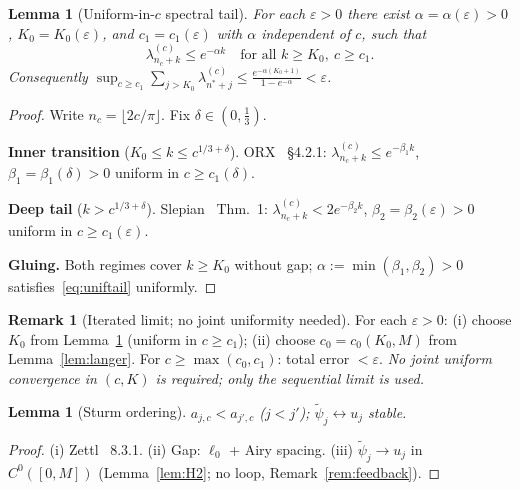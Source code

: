 \documentclass[12pt,a4paper]{amsart}
\newtheorem{lemma}[theorem]{Lemma}
\theoremstyle{definition}
\newtheorem{remark}[theorem]{Remark}
\begin{document}
\begin{lemma}[Uniform-in-$c$ spectral tail]
\label{lem:slepianunif}
For each $\varepsilon>0$ there exist
$\alpha=\alpha(\varepsilon)>0$, $K_0=K_0(\varepsilon)$,
and $c_1=c_1(\varepsilon)$ with $\alpha$ independent of $c$, such that
\begin{equation}\label{eq:uniftail}
  \lambda_{n_c+k}^{(c)}\leq e^{-\alpha k}
  \quad\text{for all }k\geq K_0,\ c\geq c_1.
\end{equation}
Consequently
$\sup_{c\geq c_1}\sum_{j>K_0}\lambda_{n^*+j}^{(c)}
\leq\frac{e^{-\alpha(K_0+1)}}{1-e^{-\alpha}}<\varepsilon$.
\end{lemma}
\begin{proof}
Write $n_c=\lfloor2c/\pi\rfloor$. Fix $\delta\in(0,\tfrac{1}{3})$.

\textbf{Inner transition} ($K_0\leq k\leq c^{1/3+\delta}$).
ORX~\cite{Osipov2013} \S4.2.1:
$\lambda_{n_c+k}^{(c)}\leq e^{-\beta_1 k}$,
$\beta_1=\beta_1(\delta)>0$ uniform in $c\geq c_1(\delta)$.

\textbf{Deep tail} ($k>c^{1/3+\delta}$).
Slepian~\cite{Slepian1978} Thm.~1:
$\lambda_{n_c+k}^{(c)}<2e^{-\beta_2 k}$,
$\beta_2=\beta_2(\varepsilon)>0$ uniform in $c\geq c_1(\varepsilon)$.

\textbf{Gluing.}
Both regimes cover $k\geq K_0$ without gap;
$\alpha:=\min(\beta_1,\beta_2)>0$
satisfies~\eqref{eq:uniftail} uniformly.
\end{proof}

\begin{remark}[Iterated limit; no joint uniformity needed]
\label{rem:iterated}
For each $\varepsilon>0$:
(i) choose $K_0$ from Lemma~\ref{lem:slepianunif}
(uniform in $c\geq c_1$);
(ii) choose $c_0=c_0(K_0,M)$ from Lemma~\ref{lem:langer}.
For $c\geq\max(c_0,c_1)$: total error $<\varepsilon$.
\emph{No joint uniform convergence in $(c,K)$ is required;
only the sequential limit is used.}
\end{remark}

\begin{lemma}[Sturm ordering]
\label{lem:sturmunif}
$a_{j,c}<a_{j',c}$ ($j<j'$);
$\tilde\psi_j\leftrightarrow u_j$ stable.
\end{lemma}
\begin{proof}
(i) Zettl~\cite{Zettl2005} 8.3.1.
(ii) Gap: $\ell_0$ + Airy spacing.
(iii) $\tilde\psi_j\to u_j$ in $C^0([0,M])$
(Lemma~\ref{lem:H2}; no loop, Remark~\ref{rem:feedback}).
\end{proof}

\end{document}
